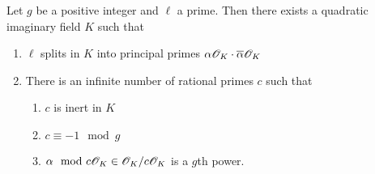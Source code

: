 \documentclass{amsart}
\begin{document}
\begin{lemma}\label{lem:K-exists}
  Let $g$ be a positive integer and $\ell$ a prime. Then there exists a quadratic imaginary field $K$ such that
  \begin{enumerate}
    \item $\ell$ splits in $K$ into principal primes $\alpha\mathscr{O}_K \cdot \overline{\alpha}\mathscr{O}_K$
    \item There is an infinite number of rational primes $c$ such that
    \begin{enumerate}
      \item $c$ is inert in $K$
      \item $c \equiv -1 \mod{g}$
      \item $\alpha \mod c\mathscr{O}_K \in \mathscr{O}_K/c\mathscr{O}_K$ is a $g$th power.
    \end{enumerate}
  \end{enumerate}
\end{lemma}
\end{document}
